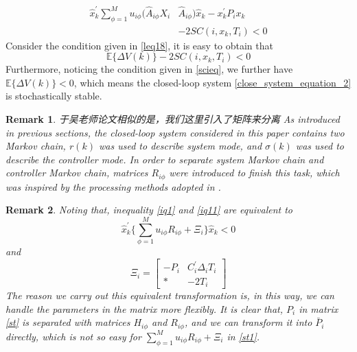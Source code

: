 \documentclass[conference]{IEEEtran}
\newtheorem{remark}{Remark}
\begin{document}
\begin{equation} \label{leq22}
	\begin{split}
	\hat{x}^{'}_{k}\sum_{\phi=1}^{M} u_{i\phi}(\hat{A}_{i\phi}X_{i}&\hat{A}_{i\phi}) \hat{x}_{k} - x^{'}_{k}P_{i}x_{k}\\
	&-2SC(i,x_k,T_i)<0
	\end{split}
\end{equation}
Consider the condition given in \eqref{leq18}, it is easy to obtain that
\begin{equation}
		\mathbb{E}\{\varDelta V(k)\}-2SC(i,x_k,T_i)<0
\end{equation}
Furthermore, noticing the condition given in \eqref{scieq}, we further have $\mathbb{E}\{\varDelta V(k)\} <0$, which means the closed-loop system \eqref{close_system_equation_2} is stochastically stable.
\begin{remark}
	于吴老师论文相似的是，我们这里引入了矩阵来分离
	As introduced in previous sections, the closed-loop system considered in this paper contains two Markov chain, $r(k)$ was used to describe system mode, and $\sigma(k)$ was used to describe the controller mode. In order to separate system Markov chain and controller Markov chain, matrices $R_{i\phi}$ were introduced to finish this task, which was inspired by the processing methods adopted in \cite{l2_filter_wu}. 
\end{remark}
\begin{remark}
	Noting that, inequality \eqref{iq1} and \eqref{iq11} are equivalent to
	\begin{equation}\label{st1}
		\hat{x}^{'}_{k}\{\sum_{\phi=1}^{M}u_{i\phi}R_{i\phi}+\varXi_{i} \}\hat{x}_{k}<0
	\end{equation}
	and 
	\begin{equation*}
	\varXi_{i}=\begin{bmatrix}
	-P_{i}&C^{'}_{i}\varDelta_{i}T_{i}\\
	*&-2T_{i}
	\end{bmatrix}
	\end{equation*} 
	The reason we carry out this equivalent transformation is, in this way, we can handle the parameters in the matrix more flexibly. It is clear that, $P_i$ in matrix \eqref{st} is separated with matrices $H_{i\phi}$ and $R_{i\phi}$, and we can transform it into $\bar{P}_{i}$ directly, which is not so easy for $\sum_{\phi=1}^{M}u_{i\phi}R_{i\phi}+\varXi_{i}$ in \eqref{st1}.
\end{remark}
\end{document}
